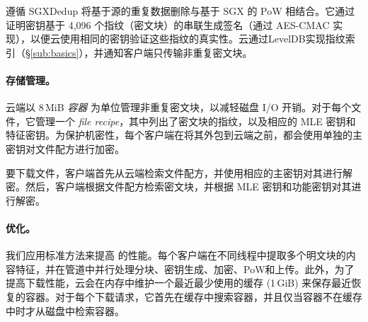 \prototype 遵循 SGXDedup 将基于源的重复数据删除与基于 SGX 的 PoW 相结合。它通过证明密钥基于 4,096 个指纹（密文块）的串联生成签名（通过 AES-CMAC 实现），以便云使用相同的密钥验证这些指纹的真实性。云通过LevelDB\cite{leveldb}实现指纹索引（\S\ref{sub:basics}），并通知客户端只传输非重复密文块。

\paragraph{存储管理。}
云端以 8\,MiB {\em 容器} 为单位管理非重复密文块，以减轻磁盘 I/O 开销。对于每个文件，它管理一个 {\em file recipe}，其中列出了密文块的指纹，以及相应的 MLE 密钥和特征密钥。为保护机密性，每个客户端在将其外包到云端之前，都会使用单独的主密钥对文件配方进行加密。

要下载文件，客户端首先从云端检索文件配方，并使用相应的主密钥对其进行解密。然后，客户端根据文件配方检索密文块，并根据 MLE 密钥和功能密钥对其进行解密。

\paragraph{优化。}
我们应用标准方法来提高 \prototype 的性能。每个客户端在不同线程中提取多个明文块的内容特征，并在管道中并行处理分块、密钥生成、加密、PoW和上传。此外，为了提高下载性能，云会在内存中维护一个最近最少使用的缓存 (1\,GiB) 来保存最近恢复的容器。对于每个下载请求，它首先在缓存中搜索容器，并且仅当容器不在缓存中时才从磁盘中检索容器。